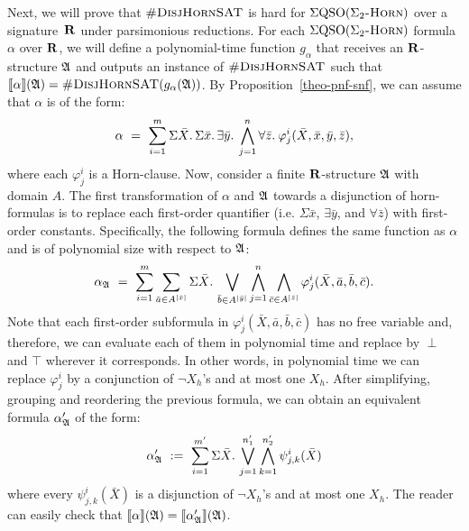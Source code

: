 Next, we will prove that $\textsc{\#DisjHornSAT}$ is hard for $\Sigma{\rm QSO}(\Sigma_2\textsc{-Horn})$ over a signature~$\mathbf{R}$ under parsimonious reductions. For each $\Sigma{\rm QSO}(\Sigma_2\textsc{-Horn})$ formula $\alpha$ over $\mathbf{R}$, we will define a polynomial-time function $g_{\alpha}$ that  receives an $\mathbf{R}$-structure $\mathfrak{A}$ and outputs an instance of $\textsc{\#DisjHornSAT}$ such that ${\llbracket{}{\alpha}\rrbracket}(\mathfrak{A}) = \textsc{\#DisjHornSAT}(g_{\alpha}(\mathfrak{A}))$. By Proposition~\ref{theo-pnf-snf}, we can assume that $\alpha$ is of the form:
$$
\alpha \ = \ \sum_{i = 1}^{m} \Sigma{\bar{X}}.\,\Sigma{\bar{x}}.\, \exists{\bar{y}}.\: \bigwedge_{j = 1}^{n} \forall{\bar{z}}.\: \varphi^i_j(\bar{X},\bar{x},\bar{y},\bar{z}),
$$
where each $\varphi^i_j$ is a Horn-clause.
Now, consider a finite $\mathbf{R}$-structure $\mathfrak{A}$ with domain $A$. 
The first transformation of $\alpha$ and $\mathfrak{A}$ towards a disjunction of horn-formulas is to replace each first-order quantifier (i.e. $\Sigma{\bar{x}}$,  $\exists\bar{y}$, and $\forall\bar{z}$) with first-order constants. Specifically, the following formula defines the same function as $\alpha$ and is of polynomial size with respect to $\mathfrak{A}$:
$$
\alpha_{\mathfrak{A}} \ = \ \sum_{i = 1}^{m} \sum_{\bar{a}\in A^{\vert \bar{x} \vert}} \Sigma{\bar{X}}.\,\bigvee_{\bar{b}\in A^{\vert \bar{y} \vert}}\bigwedge_{j = 1}^{n}\bigwedge_{\bar{c}\in A^{\vert \bar{z} \vert}}\varphi^i_j(\bar{X},\bar{a},\bar{b},\bar{c}).
$$
Note that each first-order subformula in $\varphi^i_j(\bar{X},\bar{a},\bar{b},\bar{c})$ has no free variable and, therefore, we can evaluate each of them in polynomial time and replace by $\perp$ and $\top$ wherever it corresponds. In other words, in polynomial time we can replace $\varphi^i_j$ by a conjunction of $\neg X_{h}$'s and at most one $X_{h}$.
After simplifying, grouping and reordering the previous formula, we can obtain an equivalent formula $\alpha_{\mathfrak{A}}'$ of the form:
$$
\alpha_{\mathfrak{A}}' \ := \ \sum_{i = 1}^{m'}\Sigma{\bar{X}}.\,\bigvee_{j = 1}^{n_1'}\bigwedge_{k = 1}^{n_2'}\psi^{i}_{j,k}(\bar{X})
$$
where every $\psi^{i}_{j,k}(\bar{X})$ is a disjunction of $\neg X_{h}$'s and at most one $X_{h}$.
The reader can easily check that ${\llbracket{}{\alpha}\rrbracket}(\mathfrak{A}) = {\llbracket{}{\alpha_{\mathfrak{A}}'}\rrbracket}(\mathfrak{A})$. 

